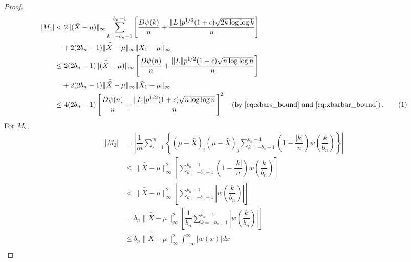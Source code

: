 \documentclass[11pt]{article}
\newcommand\numberthis{\addtocounter{equation}{1}\tag{\theequation}}
\theoremstyle{remark}
\begin{document}
\begin{proof}
\begin{align*}
|M_1|
    & < 2\|(\bar{\bar{X}} - \mu)\|_{\infty}\sum\limits_{k=-b_n + 1}^{b_n-1}\left[ \dfrac{D \psi(k)}{n} + \dfrac{\|L\| p^{1/2}(1+\epsilon)\sqrt{2k \log\log k}}{n}  \right] \\
    & \quad + 2(2b_n - 1)\|\bar{\bar{X}} - \mu\|_{\infty}\|\bar{X}_1 - \mu\|_{\infty} \\
    &\leq 2(2b_n - 1)\|(\bar{\bar{X}} - \mu)\|_{\infty} \left[ \dfrac{D \psi(n)}{n} + \dfrac{\|L\| p^{1/2}(1+\epsilon)\sqrt{n \log\log n}}{n}  \right]\\
    & \quad  + 2(2b_n - 1)\|\bar{\bar{X}} - \mu\|_{\infty}\|\bar{X}_1 - \mu\|_{\infty}\\
    & \leq 4(2b_n - 1)\left[ \dfrac{D \psi(n)}{n} + \dfrac{\|L\| p^{1/2}(1+\epsilon)\sqrt{n \log\log n}}{n}  \right]^2  \quad \text{(by \eqref{eq:xbars_bound} and \eqref{eq:xbarbar_bound})}\,. \numberthis \label{eq:strong_consis_term-1}
\end{align*}
%
%
For $M_2$,
\begin{align*}
   |M_2| & = \left|\dfrac{1}{m}\sum\limits_{s=1}^{m}\left\{ \left(\mu - \bar{\bar{X}} \right)_i  \left(\mu - \bar{\bar{X}} \right)_j\sum_{k=-b_n+1}^{b_n-1}\left(1-\dfrac{|k|}{n}\right)w\left(\dfrac{k}{b_n}\right)\right\}\right|\\
    & \leq\|\bar{\bar{X}} - \mu\|_{\infty}^2\left[\sum_{k=-b_n+1}^{b_n-1}\left(1-\dfrac{|k|}{n}\right)w\left(\dfrac{k}{b_n}\right)\right]\\
    &< \|\bar{\bar{X}} - \mu\|_{\infty}^2\left[\sum_{k=-b_n+1}^{b_n-1}\left|w\left(\dfrac{k}{b_n}\right)\right|\right]\\
    &= b_n\|\bar{\bar{X}} - \mu\|_{\infty}^2\left[\dfrac{1}{b_n}\sum_{k=-b_n+1}^{b_n-1}\left|w\left(\dfrac{k}{b_n}\right)\right|\right]\\
    & \leq b_n\|\bar{\bar{X}} - \mu\|_{\infty}^2 \int_{-\infty}^{\infty}|w(x)|dx \\

\end{align*}
\end{proof}
\end{document}
